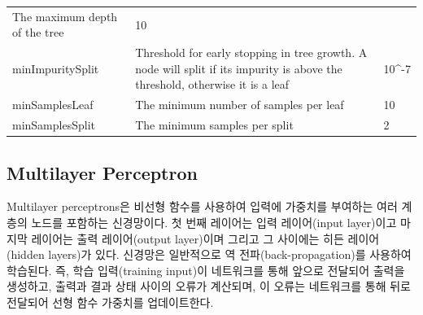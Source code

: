 \documentclass[11pt]{book}
\theoremstyle{definition}
\theoremstyle{definition}
\theoremstyle{definition}
\theoremstyle{remark}
\begin{document}
\begin{longtable}[]{@{}lll@{}}
\begin{minipage}[t]{0.16\columnwidth}
The maximum depth of the tree\strut
\end{minipage} & \begin{minipage}[t]{0.20\columnwidth}\raggedright\strut
10\strut
\end{minipage}\tabularnewline
\begin{minipage}[t]{0.13\columnwidth}\raggedright\strut
minImpuritySplit\strut
\end{minipage} & \begin{minipage}[t]{0.16\columnwidth}\raggedright\strut
Threshold for early stopping in tree growth. A node will split if its
impurity is above the threshold, otherwise it is a leaf\strut
\end{minipage} & \begin{minipage}[t]{0.20\columnwidth}\raggedright\strut
10\^{}-7\strut
\end{minipage}\tabularnewline
\begin{minipage}[t]{0.13\columnwidth}\raggedright\strut
minSamplesLeaf\strut
\end{minipage} & \begin{minipage}[t]{0.16\columnwidth}\raggedright\strut
The minimum number of samples per leaf\strut
\end{minipage} & \begin{minipage}[t]{0.20\columnwidth}\raggedright\strut
10\strut
\end{minipage}\tabularnewline
\begin{minipage}[t]{0.13\columnwidth}\raggedright\strut
minSamplesSplit\strut
\end{minipage} & \begin{minipage}[t]{0.16\columnwidth}\raggedright\strut
The minimum samples per split\strut
\end{minipage} & \begin{minipage}[t]{0.20\columnwidth}\raggedright\strut
2\strut
\end{minipage}\tabularnewline
\bottomrule
\end{longtable}

\subsection{Multilayer Perceptron}\label{multilayer-perceptron}

Multilayer perceptrons은 비선형 함수를 사용하여 입력에 가중치를 부여하는
여러 계층의 노드를 포함하는 신경망이다. 첫 번째 레이어는 입력
레이어(input layer)이고 마지막 레이어는 출력 레이어(output layer)이며
그리고 그 사이에는 히든 레이어(hidden layers)가 있다. 신경망은
일반적으로 역 전파(back-propagation)를 사용하여 학습된다. 즉, 학습
입력(training input)이 네트워크를 통해 앞으로 전달되어 출력을 생성하고,
출력과 결과 상태 사이의 오류가 계산되며, 이 오류는 네트워크를 통해 뒤로
전달되어 선형 함수 가중치를 업데이트한다. 
 
\end{document}
